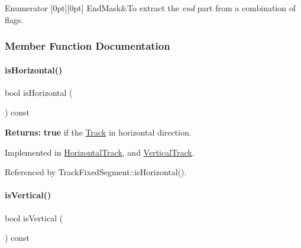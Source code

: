 \begin{DoxyEnumFields}{Enumerator}
[0pt][0pt]{}\mbox{\label{classKite_1_1Track_af4bdc8469c0fee386fc2ff30e0666bcaa0b5a81972d3a6718c3d68199467d2d11}} 
End\+Mask&To extract the {\itshape end} part from a combination of flags. \\
\hline

\end{DoxyEnumFields}


\subsubsection{Member Function Documentation}
\mbox{\label{classKite_1_1Track_a9d3db1f8a5aca58f8f54d291faebf873}} 
\paragraph{\texorpdfstring{is\+Horizontal()}{isHorizontal()}}
{\footnotesize\ttfamily bool is\+Horizontal (\begin{DoxyParamCaption}{ }\end{DoxyParamCaption}) const\hspace{0.3cm}{\ttfamily [pure virtual]}}

{\bfseries Returns\+:} {\bfseries true} if the \mbox{\hyperlink{classKite_1_1Track}{Track}} in horizontal direction. 

Implemented in \mbox{\hyperlink{classKite_1_1HorizontalTrack_a21b9cefd33ae22e4c2070ad441bdd30b}{Horizontal\+Track}}, and \mbox{\hyperlink{classKite_1_1VerticalTrack_a21b9cefd33ae22e4c2070ad441bdd30b}{Vertical\+Track}}.



Referenced by Track\+Fixed\+Segment\+::is\+Horizontal().

\mbox{\label{classKite_1_1Track_a6fa2bf0568a2b295dd7cd1f7207247d5}} 
\paragraph{\texorpdfstring{is\+Vertical()}{isVertical()}}
{\footnotesize\ttfamily bool is\+Vertical (\begin{DoxyParamCaption}{ }\end{DoxyParamCaption}) const\hspace{0.3cm}{\ttfamily [pure virtual]}}

